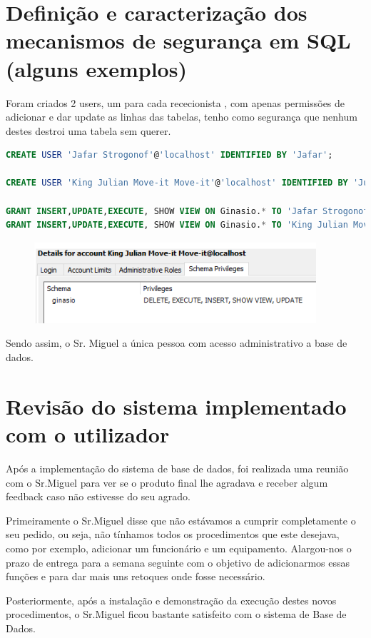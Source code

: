 \section{Definição e caracterização dos mecanismos de segurança em SQL (alguns exemplos)}
Foram criados 2 users, um para cada rececionista , com apenas permissões de adicionar e dar update as linhas das tabelas, tenho como segurança que nenhum destes destroi uma tabela sem querer.
\begin{lstlisting}[language=SQL]
CREATE USER 'Jafar Strogonof'@'localhost' IDENTIFIED BY 'Jafar';

CREATE USER 'King Julian Move-it Move-it'@'localhost' IDENTIFIED BY 'Julian';

GRANT INSERT,UPDATE,EXECUTE, SHOW VIEW ON Ginasio.* TO 'Jafar Strogonof'@'localhost';
GRANT INSERT,UPDATE,EXECUTE, SHOW VIEW ON Ginasio.* TO 'King Julian Move-it Move-it'@'localhost';
\end{lstlisting}

\begin{figure}[h]
\begin{center}
\includegraphics[scale=1.0]{implementacao_fisica/Previlegios.png}
\centering
\end{center}
\end{figure}
\par Sendo assim, o Sr. Miguel a única pessoa com acesso administrativo a base de dados.

\section{Revisão do sistema implementado com o utilizador}
Após a implementação do sistema de base de dados, foi realizada uma reunião com o Sr.Miguel para ver se o produto final lhe agradava e receber algum feedback caso não estivesse do seu agrado.
\par Primeiramente o Sr.Miguel disse que não estávamos a cumprir completamente o seu pedido, ou seja, não tínhamos todos os procedimentos que este desejava, como por exemplo, adicionar um funcionário e um equipamento. Alargou-nos o prazo de entrega para a semana seguinte com o objetivo de  adicionarmos essas funções e para dar mais uns retoques onde fosse necessário.
\par Posteriormente, após a instalação e demonstração da execução destes novos procedimentos, o  Sr.Miguel ficou bastante satisfeito com o sistema de Base de Dados.